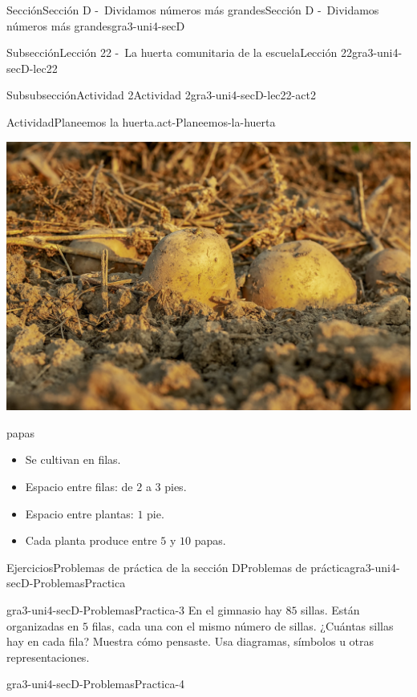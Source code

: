 \documentclass[twoside,10pt,]{article}
\begin{document}
\begin{sectionptx}{Sección}{Sección D -~Dividamos números más grandes}{}{Sección D -~Dividamos números más grandes}{}{}{gra3-uni4-secD}
\begin{subsectionptx}{Subsección}{Lección 22 -~La huerta comunitaria de la escuela}{}{Lección 22}{}{}{gra3-uni4-secD-lec22}
\begin{subsubsectionptx}{Subsubsección}{Actividad 2}{}{Actividad 2}{}{}{gra3-uni4-secD-lec22-act2}
\begin{activity}{Actividad}{Planeemos la huerta.}{act-Planeemos-la-huerta}
\begin{sidebyside}{2}{0.025}{0.025}{0.05}
\begin{sbspanel}{0.45}
\includegraphics[width=\linewidth]{external/jpg-source/3-4-D-22 Act2-papas.jpg}
%
\par
papas%
%
\begin{itemize}[label=\textbullet]
\item{}Se cultivan en filas.%
\item{}Espacio entre filas: de \(2\) a \(3\) pies.%
\item{}Espacio entre plantas: \(1\) pie.%
\item{}Cada planta produce entre \(5\) y \(10\) papas.%
\end{itemize}
\end{sbspanel}%
\end{sidebyside}%
\end{activity}%
\end{subsubsectionptx}
\end{subsectionptx}
%
%
\typeout{************************************************}
\typeout{************************************************}
%
\begin{exercises-subsection}{Ejercicios}{Problemas de práctica de la sección D}{}{Problemas de práctica}{}{}{gra3-uni4-secD-ProblemasPractica}
\begin{divisionexercise}{1}{}{}{gra3-uni4-secD-ProblemasPractica-3}%
En el gimnasio hay \(85\) sillas. Están organizadas en \(5\) filas, cada una con el mismo número de sillas. ¿Cuántas sillas hay en cada fila? Muestra cómo pensaste. Usa diagramas, símbolos u otras representaciones.%
\end{divisionexercise}%
\begin{divisionexercise}{2}{}{}{gra3-uni4-secD-ProblemasPractica-4}%
%

\end{divisionexercise}
\end{exercises-subsection}
\end{sectionptx}
\end{document}

